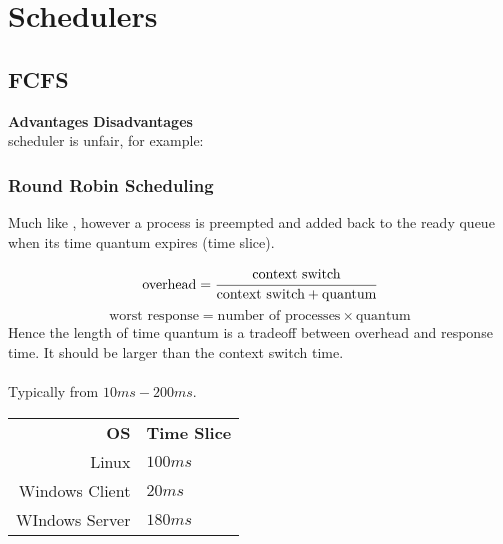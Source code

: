 \documentclass{report}
\begin{document}
    \section*{Schedulers}
        \subsection*{FCFS}
            \textbf{Advantages}
            \textbf{Disadvantages}
            \\ scheduler is unfair, for example:
        \subsubsection*{Round Robin Scheduling}
            Much like , however a process is preempted and added back to the ready queue when its time quantum expires (time slice).

            \[\text{overhead} = \cfrac{\text{context switch}}{\text{context switch} + \text{quantum}}\]
            \[\text{worst response} = \text{number of processes} \times \text{quantum}\]
            Hence the length of time quantum is a tradeoff between overhead and response time. It should be larger than the context switch time.
            \\ 
            \\ Typically from $10ms - 200ms$.
            \begin{center}
                \begin{tabular}{r l}
                    \textbf{OS} & \textbf{Time Slice} \\
                    Linux & $100ms$ \\
                    Windows Client & $20ms$ \\
                    WIndows Server & $180ms$ \\
                \end{tabular}
            \end{center}
\end{document}
